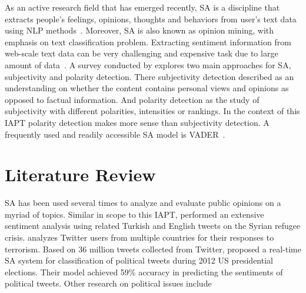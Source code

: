 As an active research field that has emerged recently, \ac{SA} is a discipline that extracts people’s feelings, opinions, thoughts and behaviors from user’s text data using \ac{NLP} methods~\citep{danneman2014social}.
Moreover, \ac{SA} is also known as opinion mining, with emphasis on text classification problem.
Extracting sentiment information from web-scale text data can be very challenging and expensive task due to large amount of data~\citep{FernndezGavilanes2016}.
A survey conducted by \citet{Lo2016} explores two main approaches for \ac{SA}, subjectivity and polarity detection.
There subjectivity detection described as an understanding on whether the content contains personal views and opinions as opposed to factual information.
And polarity detection as the study of subjectivity with different polarities, intensities or rankings.
In the context of this \ac{IAPT} polarity detection makes more sense than subjectivity detection.
A frequently used and readily accessible \ac{SA} model is \ac{VADER}~\citep{Hutto_Gilbert_2014}.



\section{Literature Review}

\ac{SA} has been used several times to analyze and evaluate public opinions on a myriad of topics.
Similar in scope to this \ac{IAPT}, \citet{ztrk2018} performed an extensive sentiment analysis using related Turkish and English tweets on the Syrian refugee crisis.
\citet{MANSOUR201895} analyzes Twitter users from multiple countries for their responses to terrorism.
Based on 36 million tweets collected from Twitter, \citet{wang2012system} proposed a real-time \ac{SA} system for classification of political tweets during 2012 US presidential elections.
Their model achieved 59\% accuracy in predicting the sentiments of political tweets.
Other research on political issues include~\citep{park2016expanding, ahmed20162014, bollen2011twitter, cheong2011microblogging}

